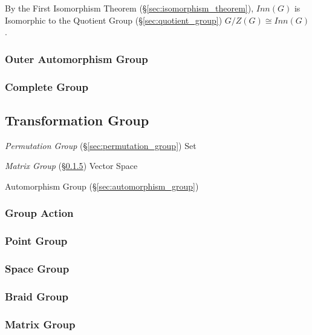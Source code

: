 By the First Isomorphism Theorem (\S\ref{sec:isomorphism_theorem}),
$Inn(G)$ is Isomorphic to the Quotient Group
(\S\ref{sec:quotient_group}) $G / Z(G) \cong Inn(G)$.



\subsubsection{Outer Automorphism Group}\label{sec:outer_automorphism_group}

\subsubsection{Complete Group}\label{sec:complete_group}



\subsection{Transformation Group}\label{sec:transformation_group}

\emph{Permutation Group} (\S\ref{sec:permutation_group}) Set

\emph{Matrix Group} (\S\ref{sec:matrix_group}) Vector Space

Automorphism Group (\S\ref{sec:automorphism_group})



\subsubsection{Group Action}\label{sec:group_action}

\subsubsection{Point Group}\label{sec:point_group}

\subsubsection{Space Group}\label{sec:space_group}

\subsubsection{Braid Group}\label{sec:braid_group}

\subsubsection{Matrix Group}\label{sec:matrix_group}


